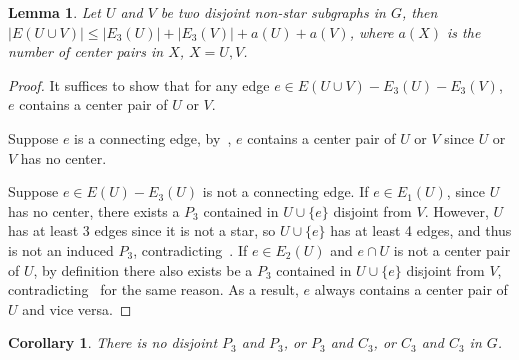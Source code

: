 \documentclass[a4paper]{article}
\newtheorem{lem}[thm]{Lemma}
\newtheorem{coro}[thm]{Corollary}
\begin{document}
\begin{lem}\label{33}
Let $U$ and $V$ be two disjoint non-star subgraphs in $G$, then $|E(U\cup V)|\leq |E_3(U)|+|E_3(V)|+a(U)+a(V)$, where $a(X)$ is the number of center pairs in $X$, $X=U,V$.
\end{lem}
\begin{proof}
It suffices to show that for any edge $e\in E(U\cup V)-E_3(U)- E_3(V)$, $e$ contains a center pair of $U$ or $V$. 

Suppose $e$ is a connecting edge, by~, $e$ contains  a center pair of $U$ or $V$ since $U$ or $V$ has no center.

Suppose $e\in E(U)-E_3(U)$ is not a connecting edge. If $e\in E_1(U)$, since $U$ has no center, there exists a $P_3$ contained in $U\cup\{e\}$ disjoint from $V$. However, $U$ has at least 3 edges since it is not a star, so $U\cup\{e\}$ has at least 4 edges, and thus is not an induced $P_3$, contradicting~. If $e\in E_2(U)$ and $e\cap U$ is not a center pair of $U$, by definition there also exists be a $P_3$ contained in $U\cup\{e\}$ disjoint from $V$, contradicting~ for the same reason. As a result, $e$ always contains a center pair of $U$ and vice versa.
\end{proof}
\begin{coro}\label{PC33}
    There is no disjoint $P_3$ and $P_3$, or $P_3$ and $C_3$, or $C_3$ and $C_3$ in $G$.
\end{coro}
\end{document}
